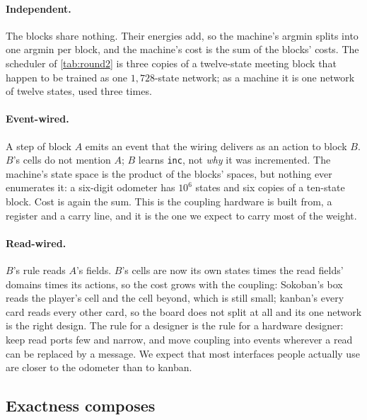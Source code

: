 \paragraph{Independent.} The blocks share nothing. Their energies add, so the machine's argmin splits into one
argmin per block, and the machine's cost is the sum of the blocks' costs. The scheduler of \cref{tab:round2} is
three copies of a twelve-state meeting block that happen to be trained as one $1{,}728$-state network; as a
machine it is one network of twelve states, used three times.

\paragraph{Event-wired.} A step of block $A$ emits an event that the wiring delivers as an action to block $B$.
$B$'s cells do not mention $A$; $B$ learns \texttt{inc}, not \emph{why} it was incremented. The machine's state
space is the product of the blocks' spaces, but nothing ever enumerates it: a six-digit odometer has $10^6$
states and six copies of a ten-state block. Cost is again the sum. This is the coupling hardware is built from,
a register and a carry line, and it is the one we expect to carry most of the weight.

\paragraph{Read-wired.} $B$'s rule reads $A$'s fields. $B$'s cells are now its own states times the read
fields' domains times its actions, so the cost grows with the coupling: Sokoban's box reads the player's cell
and the cell beyond, which is still small; kanban's every card reads every other card, so the board does not
split at all and its one network is the right design. The rule for a designer is the rule for a hardware
designer: keep read ports few and narrow, and move coupling into events wherever a read can be replaced by a
message. We expect that most interfaces people actually use are closer to the odometer than to kanban.

\subsection{Exactness composes}
\label{sec:theorem}

